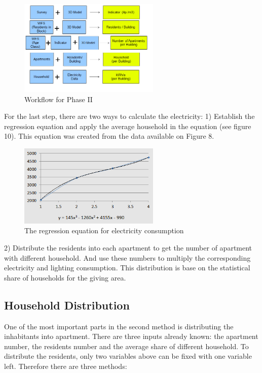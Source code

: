 \documentclass[11pt]{article}
\begin{document}
\begin{figure}[htb!]
	\centering
	\includegraphics[width=0.6\textwidth]{fig10.png}
	\caption{Workflow for Phase II }
	\label{fig:figure10}
\end{figure}

For the last step, there are two ways to calculate the electricity:
1) Establish the regression equation and apply the average household in the equation (see figure 10). This equation was created from the data available on Figure 8.

\begin{figure}[H]
	\centering
	\includegraphics[width=0.6\textwidth]{fig11.png}
	\caption{The regression equation for electricity consumption}
	\label{fig:figure11}
\end{figure}

2) Distribute the residents into each apartment to get the number of apartment with different household. And use these numbers to multiply the corresponding electricity and lighting consumption. This distribution is base on the statistical share of households for the giving area.

\subsection{Household Distribution}
One of the most important parts in the second method is distributing the inhabitants into apartment. There are three inputs already known: the apartment number, the residents number and the average share of different household. To distribute the residents, only two variables above can be fixed with one variable left. Therefore there are three methods: 
\end{document}
